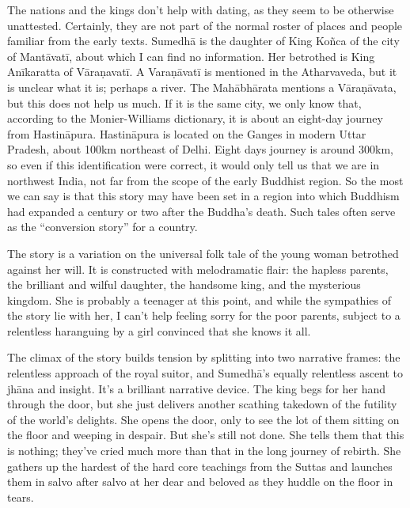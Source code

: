 \documentclass[12pt,openany]{book}%
\begin{document}
The nations and the kings don’t help with dating, as they seem to be otherwise unattested. Certainly, they are not part of the normal roster of places and people familiar from the early texts. \textsanskrit{Sumedhā} is the daughter of King \textsanskrit{Koñca} of the city of \textsanskrit{Mantāvatī}, about which I can find no information. Her betrothed is King \textsanskrit{Anīkaratta} of \textsanskrit{Vāraṇavatī}. A \textsanskrit{Varaṇāvatī} is mentioned in the Atharvaveda, but it is unclear what it is; perhaps a river. The \textsanskrit{Mahābhārata} mentions a \textsanskrit{Vāraṇāvata}, but this does not help us much. If it is the same city, we only know that, according to the Monier-Williams dictionary, it is about an eight-day journey from \textsanskrit{Hastināpura}. \textsanskrit{Hastināpura} is located on the Ganges in modern Uttar Pradesh, about 100km northeast of Delhi. Eight days journey is around 300km, so even if this identification were correct, it would only tell us that we are in northwest India, not far from the scope of the early Buddhist region. So the most we can say is that this story may have been set in a region into which Buddhism had expanded a century or two after the Buddha’s death. Such tales often serve as the “conversion story” for a country.

The story is a variation on the universal folk tale of the young woman betrothed against her will. It is constructed with melodramatic flair: the hapless parents, the brilliant and wilful daughter, the handsome king, and the mysterious kingdom. She is probably a teenager at this point, and while the sympathies of the story lie with her, I can’t help feeling sorry for the poor parents, subject to a relentless haranguing by a girl convinced that she knows it all.

The climax of the story builds tension by splitting into two narrative frames: the relentless approach of the royal suitor, and \textsanskrit{Sumedhā}’s equally relentless ascent to \textsanskrit{jhāna} and insight. It’s a brilliant narrative device. The king begs for her hand through the door, but she just delivers another scathing takedown of the futility of the world’s delights. She opens the door, only to see the lot of them sitting on the floor and weeping in despair. But she’s still not done. She tells them that this is nothing; they’ve cried much more than that in the long journey of rebirth. She gathers up the hardest of the hard core teachings from the Suttas and launches them in salvo after salvo at her dear and beloved as they huddle on the floor in tears.
\end{document}
